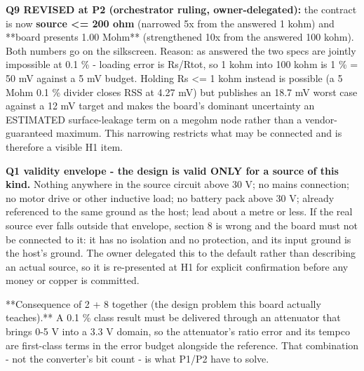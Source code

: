 \documentclass[11pt,a4paper]{article}
\begin{document}
\textbf{Q9 REVISED at P2 (orchestrator ruling, owner-delegated):} the contract is now \textbf{source \textless{}= 200 ohm} (narrowed 5x from the answered 1 kohm) and {*}{*}board presents 1.00 Mohm{*}{*} (strengthened 10x from the answered 100 kohm). Both numbers go on the silkscreen. Reason: as answered the two specs are jointly impossible at 0.1 \% - loading error is Rs/Rtot, so 1 kohm into 100 kohm is 1 \% = 50 mV against a 5 mV budget. Holding Rs \textless{}= 1 kohm instead is possible (a 5 Mohm 0.1 \% divider closes RSS at 4.27 mV) but publishes an 18.7 mV worst case against a 12 mV target and makes the board's dominant uncertainty an ESTIMATED surface-leakage term on a megohm node rather than a vendor-guaranteed maximum. This narrowing restricts what may be connected and is therefore a visible H1 item.

\textbf{Q1 validity envelope - the design is valid ONLY for a source of this kind.} Nothing anywhere in the source circuit above 30 V; no mains connection; no motor drive or other inductive load; no battery pack above 30 V; already referenced to the same ground as the host; lead about a metre or less. If the real source ever falls outside that envelope, section 8 is wrong and the board must not be connected to it: it has no isolation and no protection, and its input ground is the host's ground. The owner delegated this to the default rather than describing an actual source, so it is re-presented at H1 for explicit confirmation before any money or copper is committed.

{*}{*}Consequence of 2 + 8 together (the design problem this board actually teaches).{*}{*} A 0.1 \% class result must be delivered through an attenuator that brings 0-5 V into a 3.3 V domain, so the attenuator's ratio error and its tempco are first-class terms in the error budget alongside the reference. That combination - not the converter's bit count - is what P1/P2 have to solve.
\end{document}
